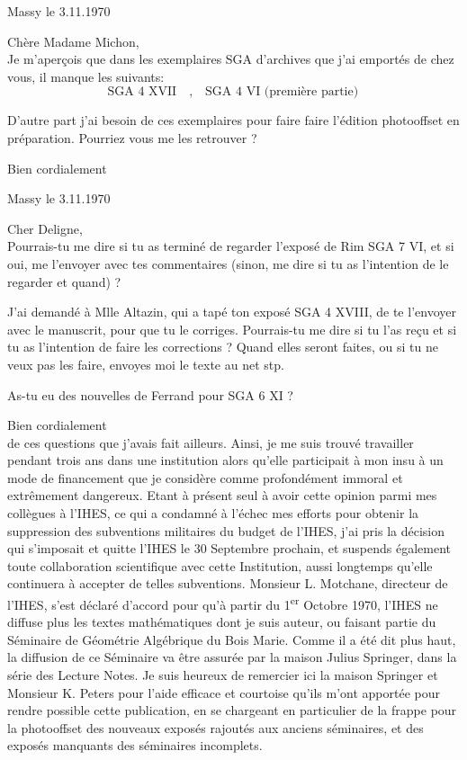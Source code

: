 \begin{flushright}
Massy le 3.11.1970\\
\end{flushright}
Chère Madame Michon,\\

Je m'aperçois que dans les exemplaires SGA d'archives que j'ai emportés de chez vous, il manque les suivants:
\[
\text{SGA 4 XVII}\quad,\quad\text{SGA 4 VI (première partie)}
\]

D'autre part j'ai besoin de ces exemplaires pour faire faire l'édition photooffset en préparation. Pourriez vous me les retrouver ?

Bien cordialement\\

\begin{flushright}
Massy le 3.11.1970\\
\end{flushright}
Cher Deligne,\\

Pourrais-tu me dire si tu as terminé de regarder l'exposé de Rim SGA 7 VI, et si oui, me l'envoyer avec tes commentaires (sinon, me dire si tu as l'intention de le regarder et quand) ?

J'ai demandé à Mlle Altazin, qui a tapé ton exposé SGA 4 XVIII, de te l'envoyer avec le manuscrit, pour que tu le corriges. Pourrais-tu me dire si tu l'as reçu et si tu as l'intention de faire les corrections ? Quand elles seront faites, ou si tu ne veux pas les faire, envoyes moi le texte au net stp.

As-tu eu des nouvelles de Ferrand pour SGA 6 XI ?

Bien cordialement\\

de ces questions que j'avais fait ailleurs. Ainsi, je me suis trouvé travailler pendant trois ans dans une institution alors qu'elle participait à mon insu à un mode de financement que je considère comme profondément immoral et extrêmement dangereux. Etant à présent seul à avoir cette opinion parmi mes collègues à l'IHES, ce qui a condamné à l'échec mes efforts pour obtenir la suppression des subventions militaires du budget de l'IHES, j'ai pris la décision qui s'imposait et quitte l'IHES le 30 Septembre prochain, et suspends également toute collaboration scientifique avec cette Institution, aussi longtemps qu'elle continuera à accepter de telles subventions. Monsieur L. Motchane, directeur de l'IHES, s'est déclaré d'accord pour qu'à partir du 1\textsuperscript{er} Octobre 1970, l'IHES ne diffuse plus les textes mathématiques dont je suis auteur, ou faisant partie du Séminaire de Géométrie Algébrique du Bois Marie. Comme il a été dit plus haut, la diffusion de ce Séminaire va être assurée par la maison Julius Springer, dans la série des Lecture Notes. Je suis heureux de remercier ici la maison Springer et Monsieur K. Peters pour l'aide efficace et courtoise qu'ils m'ont apportée pour rendre possible cette publication, en se chargeant en particulier de la frappe pour la photooffset des nouveaux exposés rajoutés aux anciens séminaires, et des exposés manquants des séminaires incomplets.

